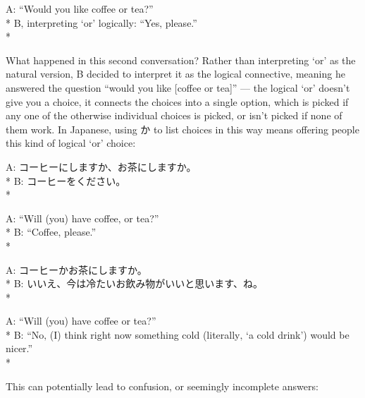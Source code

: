 \documentclass[11pt, b5paper, twoside, openright, onecolumn]{book}
\newenvironment{exampleblock}{
\setlength{\parindent}{0.6in}
\begin{minipage}[t]{\dimexpr\textwidth-\parindent}}
{\end{minipage}}
\begin{document}
\begin{exampleblock}
A: “Would you like coffee or tea?” \\* 
B‚ interpreting ‘or’ logically: “Yes‚ please.” \\* 
\end{exampleblock}
\vspace{0.2cm}

What happened in this second conversation? Rather than interpreting ‘or’ as the natural version‚ B decided to interpret it as the logical connective‚ meaning he answered the question “would you like [coffee or tea]” — the logical ‘or’ doesn’t give you a choice‚ it connects the choices into a single option‚ which is picked if any one of the otherwise individual choices is picked‚ or isn’t picked if none of them work. In Japanese‚ using か to list choices in this way means offering people this kind of logical ‘or’  choice:

\vspace{0.4cm}
\begin{exampleblock}
A: コーヒーにしますか、お茶にしますか。 \\* 
B: コーヒーをください。 \\* 
\end{exampleblock}
\vspace{0.2cm}

\begin{exampleblock}
A: “Will (you) have coffee‚ or tea?” \\* 
B: “Coffee‚ please.” \\* 
\end{exampleblock}
\vspace{0.2cm}

\begin{exampleblock}
A: コーヒーかお茶にしますか。 \\* 
B: いいえ、今は冷たいお飲み物がいいと思います、ね。 \\* 
\end{exampleblock}
\vspace{0.2cm}

\begin{exampleblock}
A: “Will (you) have coffee or tea?” \\* 
B: “No‚ (I) think right now something cold (literally‚ ‘a cold drink’) would be nicer.” \\* 
\end{exampleblock}
\vspace{0.2cm}

This can potentially lead to confusion‚ or seemingly incomplete answers:
\end{document}
